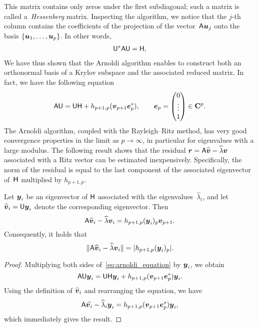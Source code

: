 This matrix contains only zeros under the first subdiagonal;
such a matrix is called a~\emph{Hessenberg} matrix.
Inspecting the algorithm,
we notice that the $j$-th column contains the coefficients of the projection of the vector~$\mathsf A \mathbf{\boldsymbol{u}}_j$ onto the basis $\{\mathbf{\boldsymbol{u}}_1, \dotsc, \mathbf{\boldsymbol{u}}_p\}$.
In other words,
\begin{align}
    \label{eq:reduced_matrix_arnoldi}
    \mathsf U^* \mathsf A \mathsf U = \mathsf H,
\end{align}
We have thus shown that the Arnoldi algorithm enables to construct both an orthonormal basis of a Krylov subspace and
the associated reduced matrix.
In fact, we have the following equation
\begin{equation}
    \label{eq:arnoldi_equation}
    \mathsf A \mathsf U = \mathsf U \mathsf H + h_{p+1,p} (\mathbf{\boldsymbol{v}}_{p+1} \mathbf{\boldsymbol{e}}_p^*),
    \qquad \mathbf{\boldsymbol{e}}_p = \begin{pmatrix} 0 \\ \vdots \\ 1 \end{pmatrix} \in \mathbf C^p.
\end{equation}
The Arnoldi algorithm, coupled with the Rayleigh--Ritz method,
has very good convergence properties in the limit as $p \to \infty$,
in particular for eigenvalues with a large modulus.
The following result shows that the residual $\mathbf{\boldsymbol{r}} = \mathsf A \widehat{\mathbf{\boldsymbol{v}}} - \widehat \lambda \mathbf{\boldsymbol{v}}$
associated with a Ritz vector can be estimated inexpensively.
Specifically, the norm of the residual is equal to the last component of the associated eigenvector of~$\mathsf H$ multiplied by $h_{p+1,p}$.
\begin{proposition}
    Let $\mathbf{\boldsymbol{y}}_i$ be an eigenvector of $\mathsf H$ associated with the eigenvalues~$\widehat \lambda_i$,
    and let $\widehat {\mathbf{\boldsymbol{v}}}_i = \mathsf U \mathbf{\boldsymbol{y}}_i$ denote the corresponding eigenvector.
    Then
    \[
        \mathsf A \widehat {\mathbf{\boldsymbol{v}}}_i - \widehat \lambda \mathbf{\boldsymbol{v}}_i = h_{p+1,p} (\mathbf{\boldsymbol{y}}_i)_p \mathbf{\boldsymbol{v}}_{p+1}.
    \]
    Consequently, it holds that
    \[
        \lVert\mathsf A \widehat {\mathbf{\boldsymbol{v}}}_i - \widehat \lambda \mathbf{\boldsymbol{v}}_i\rVert = \lvert h_{p+1,p} (\mathbf{\boldsymbol{y}}_i)_p\rvert.
    \]
\end{proposition}
\begin{proof}
    Multiplying both sides of~\eqref{eq:arnoldi_equation} by $\mathbf{\boldsymbol{y}}_i$,
    we obtain
    \[
        \mathsf A \mathsf U \mathbf{\boldsymbol{y}}_i = \mathsf U \mathsf H \mathbf{\boldsymbol{y}}_i + h_{p+1,p} (\mathbf{\boldsymbol{v}}_{p+1} \mathbf{\boldsymbol{e}}_p^*) \mathbf{\boldsymbol{y}}_i.
    \]
    Using the definition of $\widehat {\mathbf{\boldsymbol{v}}}_i$ and rearranging the equation,
    we have
    \[
        \mathsf A \widehat {\mathbf{\boldsymbol{v}}_i} - \widehat \lambda_i \mathbf{\boldsymbol{y}}_i  = h_{p+1,p} (\mathbf{\boldsymbol{v}}_{p+1} \mathbf{\boldsymbol{e}}_p^*) \mathbf{\boldsymbol{y}}_i,
    \]
    which immediately gives the result.
\end{proof}


